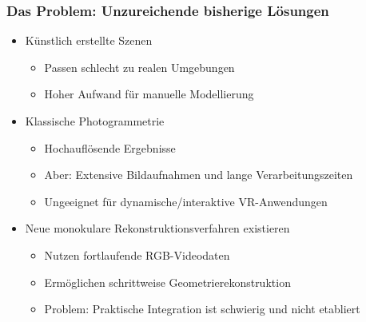 \begin{frame}
\frametitle{Das Problem: Unzureichende bisherige Lösungen}

\begin{itemize}
  \item Künstlich erstellte Szenen
  \begin{itemize}
    \item Passen schlecht zu realen Umgebungen
    \item Hoher Aufwand für manuelle Modellierung
  \end{itemize}
  
  \item Klassische Photogrammetrie
  \begin{itemize}
    \item Hochauflösende Ergebnisse
    \item Aber: Extensive Bildaufnahmen und lange Verarbeitungszeiten
    \item Ungeeignet für dynamische/interaktive VR-Anwendungen
  \end{itemize}
  
  \item Neue monokulare Rekonstruktionsverfahren existieren
  \begin{itemize}
    \item Nutzen fortlaufende RGB-Videodaten
    \item Ermöglichen schrittweise Geometrierekonstruktion
    \item Problem: Praktische Integration ist schwierig und nicht etabliert
  \end{itemize}
\end{itemize}

\end{frame}

